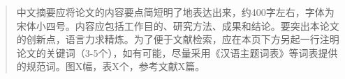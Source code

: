 \setlength{\baselineskip}{20pt}

\begin{abstract}

中文摘要应将论文的内容要点简短明了地表达出来，约400字左右，字体为宋体小四号。内容应包括工作目的、研究方法、成果和结论。要突出本论文的创新点，语言力求精炼。为了便于文献检索，应在本页下方另起一行注明论文的关键词（3-5个），如有可能，尽量采用《汉语主题词表》等词表提供的规范词。图X幅，表X个，参考文献X篇。


\par\vspace{3\baselineskip}

\noindent{}
\end{abstract}